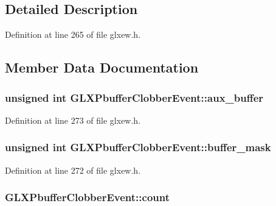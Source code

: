 \subsection{Detailed Description}


Definition at line 265 of file glxew.\-h.



\subsection{Member Data Documentation}
\hypertarget{struct_g_l_x_pbuffer_clobber_event_a13193b6e7e3e52b15f754fe91403b7ec}{
\subsubsection[{aux\-\_\-buffer}]{\setlength{\rightskip}{0pt plus 5cm}unsigned {\bf int} G\-L\-X\-Pbuffer\-Clobber\-Event\-::aux\-\_\-buffer}}\label{struct_g_l_x_pbuffer_clobber_event_a13193b6e7e3e52b15f754fe91403b7ec}


Definition at line 273 of file glxew.\-h.

\hypertarget{struct_g_l_x_pbuffer_clobber_event_aff4c23d00f6dad98427f8d32a5f10580}{
\subsubsection[{buffer\-\_\-mask}]{\setlength{\rightskip}{0pt plus 5cm}unsigned {\bf int} G\-L\-X\-Pbuffer\-Clobber\-Event\-::buffer\-\_\-mask}}\label{struct_g_l_x_pbuffer_clobber_event_aff4c23d00f6dad98427f8d32a5f10580}


Definition at line 272 of file glxew.\-h.

\hypertarget{struct_g_l_x_pbuffer_clobber_event_a61e9f6b31738464dca67f909fcacd298}{
\subsubsection[{count}]{ G\-L\-X\-Pbuffer\-Clobber\-Event\-::count}}\label{struct_g_l_x_pbuffer_clobber_event_a61e9f6b31738464dca67f909fcacd298}


